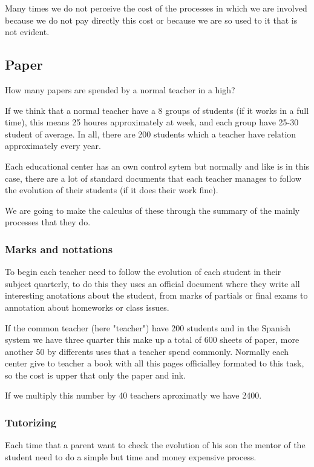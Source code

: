 Many times we do not perceive the cost of the processes in which we are involved
because we do not pay directly this cost or because we are so used to it that is
not evident.

\subsection{Paper}

How many papers are spended by a normal teacher in a high?

If we think that a normal teacher have a 8 groups of students (if it works in a
full time), this means 25 houres approximately at week, and each group have
25-30 student of average. In all, there are 200 students which a teacher have
relation approximately every year.

Each educational center has an own control sytem but normally and like is in this
case, there are a lot of standard documents that each teacher manages to follow
the evolution of their students (if it does their work fine).

We are going to make the calculus of these through the summary of the mainly
processes that they do.

\subsubsection{Marks and nottations}

To begin each teacher need to follow the evolution of each student in their
subject quarterly, to do this they uses an official document where they write
all interesting anotations about the student, from marks of partials or final
exams to annotation about homeworks or class issues.

If the common teacher (here "teacher") have 200 students and in the Spanish
system we have three quarter this make up a total of 600 sheets of paper,
more another 50 by differents uses that a teacher spend commonly.
Normally each center give to teacher a book with all this pages officialley
formated to this task, so the cost is upper that only the paper and ink.

If we multiply this number by 40 teachers aproximatly we have 2400.

\subsubsection{Tutorizing}

Each time that a parent want to check the evolution of his son the mentor
of the student need to do a simple but time and money expensive process.


